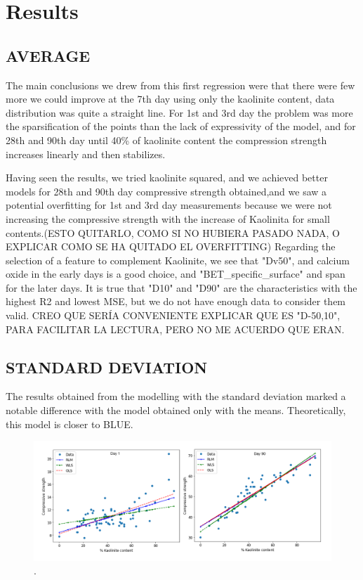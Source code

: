 \documentclass[10pt,conference,compsocconf]{IEEEtran}
\begin{document}
\section{Results}
\subsection{AVERAGE}
The main conclusions we drew from this first regression were that there were few more we could improve at the 7th day using only the kaolinite content, data distribution was quite a straight line.
For 1st and 3rd day the problem was more the sparsification of the points than the lack of expressivity of the model, and for 28th and 90th day until 40\% of kaolinite content the compression strength increases linearly and then stabilizes.

Having seen the results, we tried kaolinite squared, and we achieved better models for 28th and 90th day compressive strength obtained,and we saw a potential overfitting for 1st and 3rd day measurements because we were not increasing the compressive strength with the increase of Kaolinita for small contents.(ESTO QUITARLO, COMO SI NO HUBIERA PASADO NADA, O EXPLICAR COMO SE HA QUITADO EL OVERFITTING) 
Regarding the selection of a feature to complement Kaolinite, we see that "Dv50", and calcium oxide in the early days is a good choice, and "BET\_specific\_surface" and span for the later days. It is true that "D10" and "D90" are the characteristics with the highest R2 and lowest MSE, but we do not have enough data to consider them valid.
CREO QUE SERÍA CONVENIENTE EXPLICAR QUE ES "D-50,10", PARA FACILITAR LA LECTURA, PERO NO ME ACUERDO QUE ERAN.

\subsection{STANDARD DEVIATION}

The results obtained from the modelling with the standard deviation marked a notable difference with the model obtained only with the means. Theoretically, this model is closer to BLUE. 

\begin{figure}[htbp]
  \centering
  \includegraphics[width=\columnwidth]{figures/lr-ols-wls-rls-d1-d90.png}
  \vspace{-3mm}
  \caption{.}
  \label{fig:denoise-wavelet}
\end{figure}
\end{document}
